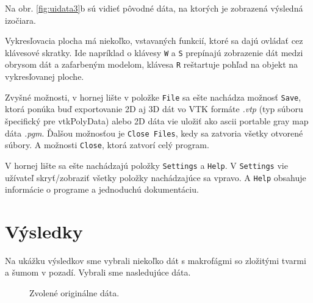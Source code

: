 \documentclass[a4paper,12pt,twoside]{article}%
\begin{document}
Na obr. \ref{fig:uidata3}b sú vidieť pôvodné dáta, na ktorých je zobrazená výsledná izočiara.

Vykresľovacia plocha má niekoľko, vstavaných funkcií, ktoré sa dajú ovládať cez klávesové skratky. Ide napríklad o klávesy \texttt{W} a \texttt{S} prepínajú zobrazenie dát medzi obrysom dát a zafarbeným modelom, klávesa \texttt{R} reštartuje pohľad na objekt na vykresľovanej ploche.
 
Zvyšné možnosti, v hornej lište v položke \texttt{File} sa ešte nachádza možnosť \texttt{Save}, ktorá ponúka buď exportovanie 2D aj 3D dát vo VTK formáte \textit{.vtp} (typ súboru špecifický pre vtkPolyData) alebo 2D dáta vie uložiť ako ascii portable gray map dáta \textit{.pgm}. Ďalšou možnosťou je \texttt{Close Files}, kedy sa zatvoria všetky otvorené súbory. A možnosti \texttt{Close}, ktorá zatvorí celý program.

V hornej lište sa ešte nachádzajú položky \texttt{Settings} a \texttt{Help}. V \texttt{Settings} vie užívateľ skryť/zobraziť všetky položky nachádzajúce sa vpravo. A \texttt{Help} obsahuje informácie o programe a jednoduchú dokumentáciu.

\newpage
\section{Výsledky}

Na ukážku výsledkov sme vybrali niekoľko dát s makrofágmi so zložitými tvarmi a šumom v pozadí. Vybrali sme nasledujúce dáta.

\begin{figure}[h!]  
    \hspace{5px}
    \hspace{5px}
    \hspace{5px}
    \caption{Zvolené originálne dáta.}
    \label{fig:ogData}
\end{figure}
\end{document}
